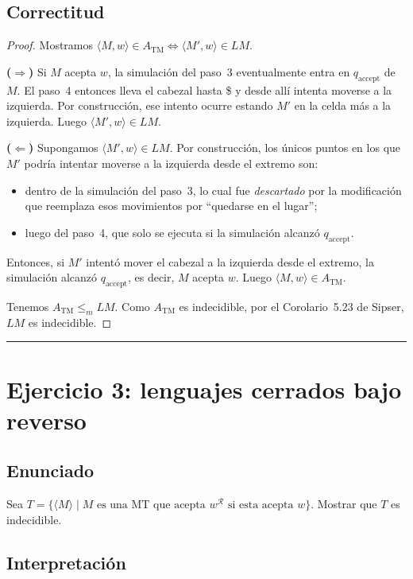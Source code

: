 \documentclass[11pt,a4paper]{article}
\theoremstyle{plain}
\theoremstyle{definition}
\theoremstyle{remark}
\newcommand{\TM}{\mathrm{TM}}
\newcommand{\enc}[1]{\langle #1\rangle}
\newcommand{\encMw}{\langle M, w\rangle}
\newcommand{\rev}[1]{#1^{\mathcal R}}
\newcommand{\redm}{\le_{m}}
\newcommand{\qaccept}{q_{\text{accept}}}
\newcommand{\ATM}{A_{\TM}}
\begin{document}
\subsection*{Correctitud}

\begin{proof}
Mostramos $\encMw \in \ATM \iff \enc{M',w}\in LM$.

\textbf{($\Rightarrow$)} Si $M$ acepta $w$, la simulaci\'on del paso~3
eventualmente entra en $\qaccept$ de $M$. El paso~4 entonces lleva el
cabezal hasta \$ y desde all\'i intenta moverse a la izquierda. Por
construcci\'on, ese intento ocurre estando $M'$ en la celda m\'as a la
izquierda. Luego $\enc{M',w}\in LM$.

\textbf{($\Leftarrow$)} Supongamos $\enc{M',w}\in LM$. Por construcci\'on,
los \'unicos puntos en los que $M'$ podr\'ia intentar moverse a la
izquierda desde el extremo son:
\begin{itemize}
  \item dentro de la simulaci\'on del paso~3, lo cual fue \emph{descartado}
        por la modificaci\'on que reemplaza esos movimientos por
        ``quedarse en el lugar'';
  \item luego del paso~4, que solo se ejecuta si la simulaci\'on alcanz\'o
        $\qaccept$.
\end{itemize}
Entonces, si $M'$ intent\'o mover el cabezal a la izquierda desde el
extremo, la simulaci\'on alcanz\'o $\qaccept$, es decir, $M$ acepta $w$.
Luego $\encMw \in \ATM$.

Tenemos $\ATM \redm LM$. Como $\ATM$ es indecidible, por el
Corolario~5.23 de Sipser, $LM$ es indecidible.
\end{proof}

\bigskip\hrule\bigskip

\section{Ejercicio 3: lenguajes cerrados bajo reverso}
\label{sec:ej3}

\subsection*{Enunciado}

Sea $T = \{\enc{M} \mid M \text{ es una MT que acepta } \rev{w}
\text{ si esta acepta } w\}$. Mostrar que $T$ es indecidible.

\subsection*{Interpretaci\'on}
\end{document}
